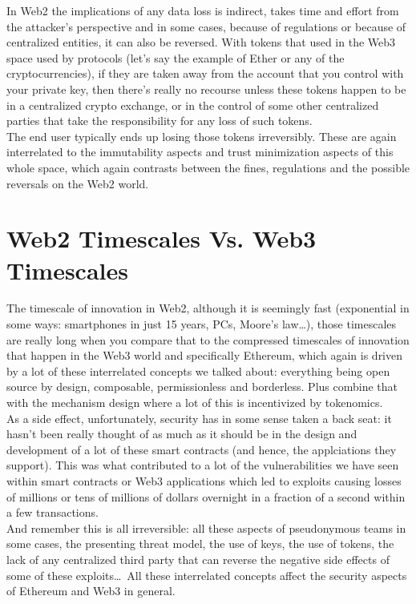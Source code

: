 In Web2 the implications of any data loss is indirect, takes time and effort from the attacker's perspective and in some cases, because of regulations or because of centralized entities, it can also be reversed.
With tokens that used in the Web3 space used by protocols (let's say the example of Ether or any of the cryptocurrencies), if they are taken away from the account that you control with your private key, then there's really no recourse unless these tokens happen to be in a centralized crypto exchange, or in the control of some other centralized parties that take the responsibility for any loss of such tokens.\\

The end user typically ends up losing those tokens irreversibly.
These are again interrelated to the immutability aspects and trust minimization aspects of this whole space, which again contrasts between the fines, regulations and the possible reversals on the Web2 world.

\section{Web2 Timescales Vs. Web3 Timescales}

The timescale of innovation in Web2, although it is seemingly fast (exponential in some ways: smartphones in just 15 years, PCs, Moore's law\dots), those timescales are really long when you compare that to the compressed timescales of innovation that happen in the Web3 world and specifically Ethereum, which again is driven by a lot of these interrelated concepts we talked about: everything being open source by design, composable, permissionless and borderless.
Plus combine that with the mechanism design where a lot of this is incentivized by tokenomics.\\

As a side effect, unfortunately, security has in some sense taken a back seat: it hasn't been really thought of as much as it should be in the design and development of a lot of these smart contracts (and hence, the applciations they support).
This was what contributed to a lot of the vulnerabilities we have seen within smart contracts or Web3 applications which led to exploits causing losses of millions or tens of millions of dollars overnight in a fraction of a second within a few transactions.\\

And remember this is all irreversible: all these aspects of pseudonymous teams in some cases, the presenting threat model, the use of keys, the use of tokens, the lack of any centralized third party that can reverse the negative side effects of some of these exploits\dots\,
All these interrelated concepts affect the security aspects of Ethereum and Web3 in general.

